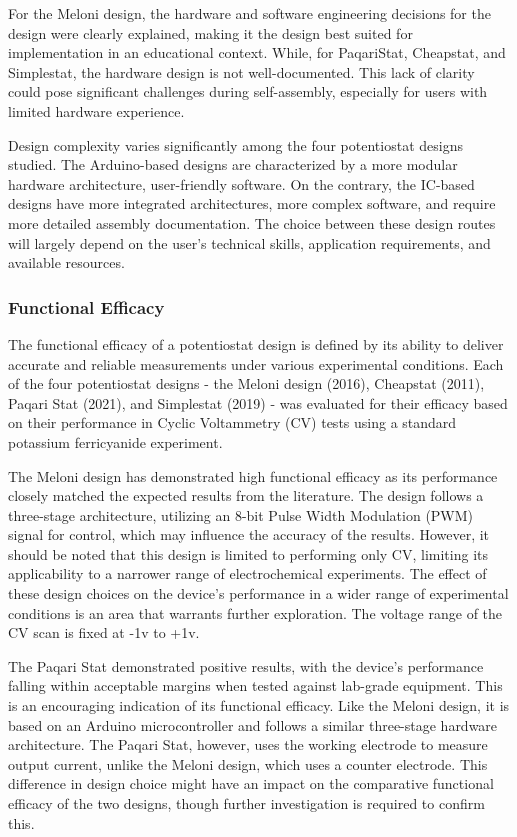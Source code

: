 \documentclass{article}
\begin{document}
For the Meloni design, the hardware and software engineering decisions for the design were clearly explained, making it the design best suited for implementation in an educational context. While, for PaqariStat, Cheapstat, and Simplestat, the hardware design is not well-documented. This lack of clarity could pose significant challenges during self-assembly, especially for users with limited hardware experience. 

Design complexity varies significantly among the four potentiostat designs studied. The Arduino-based designs are characterized by a more modular hardware architecture, user-friendly software. On the contrary, the IC-based designs have more integrated architectures, more complex software, and require more detailed assembly documentation. The choice between these design routes will largely depend on the user's technical skills, application requirements, and available resources.

\subsubsection*{Functional Efficacy}
The functional efficacy of a potentiostat design is defined by its ability to deliver accurate and reliable measurements under various experimental conditions. Each of the four potentiostat designs - the Meloni design (2016), Cheapstat (2011), Paqari Stat (2021), and Simplestat (2019) - was evaluated for their efficacy based on their performance in Cyclic Voltammetry (CV) tests using a standard potassium ferricyanide experiment.

The Meloni design has demonstrated high functional efficacy as its performance closely matched the expected results from the literature. The design follows a three-stage architecture, utilizing an 8-bit Pulse Width Modulation (PWM) signal for control, which may influence the accuracy of the results. However, it should be noted that this design is limited to performing only CV, limiting its applicability to a narrower range of electrochemical experiments. The effect of these design choices on the device's performance in a wider range of experimental conditions is an area that warrants further exploration. The voltage range of the CV scan is fixed at -1v to +1v.

The Paqari Stat demonstrated positive results, with the device's performance falling within acceptable margins when tested against lab-grade equipment. This is an encouraging indication of its functional efficacy. Like the Meloni design, it is based on an Arduino microcontroller and follows a similar three-stage hardware architecture. The Paqari Stat, however, uses the working electrode to measure output current, unlike the Meloni design, which uses a counter electrode. This difference in design choice might have an impact on the comparative functional efficacy of the two designs, though further investigation is required to confirm this.
\end{document}
